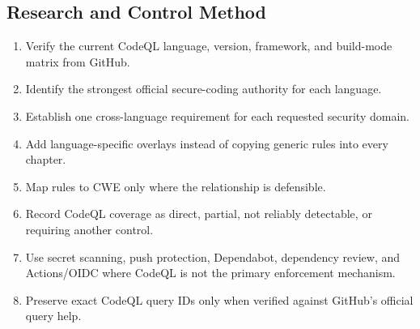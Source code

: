 \documentclass[10pt,letterpaper]{article}
\begin{document}
\subsection{Research and Control Method}
\begin{enumerate}[leftmargin=*,itemsep=2pt]
  \item Verify the current CodeQL language, version, framework, and build-mode matrix from GitHub.
  \item Identify the strongest official secure-coding authority for each language.
  \item Establish one cross-language requirement for each requested security domain.
  \item Add language-specific overlays instead of copying generic rules into every chapter.
  \item Map rules to CWE only where the relationship is defensible.
  \item Record CodeQL coverage as direct, partial, not reliably detectable, or requiring another control.
  \item Use secret scanning, push protection, Dependabot, dependency review, and Actions/OIDC where CodeQL is not the primary enforcement mechanism.
  \item Preserve exact CodeQL query IDs only when verified against GitHub's official query help.
\end{enumerate}
\end{document}
